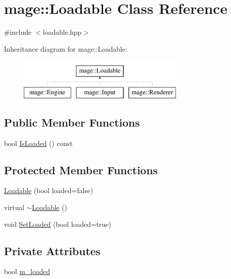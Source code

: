 \hypertarget{classmage_1_1_loadable}{}\section{mage\+:\+:Loadable Class Reference}
\label{classmage_1_1_loadable}


{\ttfamily \#include $<$loadable.\+hpp$>$}

Inheritance diagram for mage\+:\+:Loadable\+:\begin{figure}[H]
\begin{center}
\leavevmode
\includegraphics[height=2.000000cm]{classmage_1_1_loadable}
\end{center}
\end{figure}
\subsection*{Public Member Functions}
\begin{DoxyCompactItemize}
\item 
bool \hyperlink{classmage_1_1_loadable_a53cfa5beb9b44bbcda0d6166a54b8cb6}{Is\+Loaded} () const
\end{DoxyCompactItemize}
\subsection*{Protected Member Functions}
\begin{DoxyCompactItemize}
\item 
\hyperlink{classmage_1_1_loadable_afbdcb287b5e20583899a27a1c244bc7d}{Loadable} (bool loaded=false)
\item 
virtual \hyperlink{classmage_1_1_loadable_a009ef5ebc9baf803b19110d937922b41}{$\sim$\+Loadable} ()
\item 
void \hyperlink{classmage_1_1_loadable_a932ff8b287c8e68e30a13804cba08ff2}{Set\+Loaded} (bool loaded=true)
\end{DoxyCompactItemize}
\subsection*{Private Attributes}
\begin{DoxyCompactItemize}
\item 
bool \hyperlink{classmage_1_1_loadable_a993963fbfeb0f2e2ab9616bf7ef6a0f7}{m\+\_\+loaded}
\end{DoxyCompactItemize}


